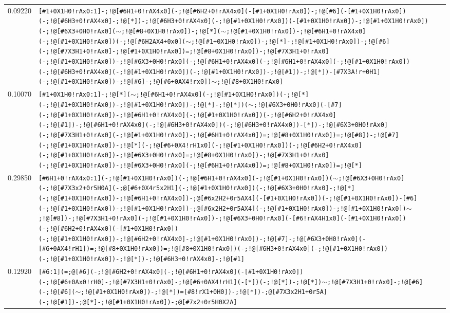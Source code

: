 \begin{longtable}{>{\baselineskip=10pt}p{} >{\baselineskip=10pt}p{}}
0.09220 & \texttt{[\#1+0X1H0!rAx0:1]-;!@[\#6H1+0!rAX4x0](-;!@[\#6H2+0!rAX4x0](-[\#1+0X1H0!rAx0])-;!@[\#6](-[\#1+0X1H0!rAx0])(-;!@[\#6H3+0!rAX4x0]-;!@[*])-;!@[\#6H3+0!rAX4x0](-;!@[\#1+0X1H0!rAx0])(-[\#1+0X1H0!rAx0])-;!@[\#1+0X1H0!rAx0])(-;!@[\#6X3+0H0!rAx0]($\sim$;!@[\#8+0X1H0!rAx0])-;!@[*]($\sim$;!@[\#1+0X1H0!rAx0])-;!@[\#6H1+0!rAX4x0](-;!@[\#1+0X1H0!rAx0])(-;!@[\#6H2AX4+0x0]($\sim$;!@[\#1+0X1H0!rAx0])-;!@[*]-;!@[\#1+0X1H0!rAx0])-;!@[\#6](-;!@[\#7X3H1+0!rAx0]-;!@[\#1+0X1H0!rAx0])=;!@[\#8+0X1H0!rAx0])-;!@[\#7X3H1+0!rAx0](-;!@[\#1+0X1H0!rAx0])-;!@[\#6X3+0H0!rAx0](-;!@[\#6H1+0!rAX4x0](-;!@[\#6H1+0!rAX4x0](-;!@[\#1+0X1H0!rAx0])(-;!@[\#6H3+0!rAX4x0](-;!@[\#1+0X1H0!rAx0])(-;!@[\#1+0X1H0!rAx0])-;!@[\#1])-;!@[*])-[\#7X3A!r+0H1](-;!@[\#1+0X1H0!rAx0])-;!@[\#6]-;!@[\#6+0AX4!rx0])$\sim$;!@[\#8+0X1H0!rAx0]} \\ 
0.10070 & \texttt{[\#1+0X1H0!rAx0:1]-;!@[*]($\sim$;!@[\#6H1+0!rAX4x0](-;!@[\#1+0X1H0!rAx0])(-;!@[*](-;!@[\#1+0X1H0!rAx0])-;!@[\#1+0X1H0!rAx0])-;!@[*]-;!@[*])($\sim$;!@[\#6X3+0H0!rAx0](-[\#7](-;!@[\#1+0X1H0!rAx0])-;!@[\#6H1+0!rAX4x0](-;!@[\#1+0X1H0!rAx0])(-;!@[\#6H2+0!rAX4x0](-;!@[\#1])-;!@[\#6H1+0!rAX4x0](-;!@[\#6H3+0!rAX4x0])(-;!@[\#6H3+0!rAX4x0])-[*])-;!@[\#6X3+0H0!rAx0](-;!@[\#7X3H1+0!rAx0](-;!@[\#1+0X1H0!rAx0])-;!@[\#6H1+0!rAX4x0])=;!@[\#8+0X1H0!rAx0])=;!@[\#8])-;!@[\#7](-;!@[\#1+0X1H0!rAx0])-;!@[*](-;!@[\#6+0X4!rH1x0](-;!@[\#1+0X1H0!rAx0])(-;!@[\#6H2+0!rAX4x0](-;!@[\#1+0X1H0!rAx0])-;!@[\#6X3+0H0!rAx0]=;!@[\#8+0X1H0!rAx0])-;!@[\#7X3H1+0!rAx0](-;!@[\#1+0X1H0!rAx0])-;!@[\#6X3+0H0!rAx0](-;!@[\#6H1+0!rAX4x0])=;!@[\#8+0X1H0!rAx0])=;!@[*]} \\ 
0.29850 & \texttt{[\#6H1+0!rAX4x0:1](-;!@[\#1+0X1H0!rAx0])(-;!@[\#6H1+0!rAX4x0](-;!@[\#1+0X1H0!rAx0])($\sim$;!@[\#6X3+0H0!rAx0](-;!@[\#7X3x2+0r5H0A](-;@[\#6+0X4r5x2H1](-;!@[\#1+0X1H0!rAx0])(-;!@[\#6X3+0H0!rAx0]-;!@[*](-;!@[\#1+0X1H0!rAx0])-;!@[\#6H1+0!rAX4x0])-;@[\#6x2H2+0r5AX4](-[\#1+0X1H0!rAx0])(-;!@[\#1+0X1H0!rAx0])-[\#6](-;!@[\#1+0X1H0!rAx0])-;!@[\#1+0X1H0!rAx0])-;@[\#6x2H2+0r5AX4](-;!@[\#1+0X1H0!rAx0])-;!@[\#1+0X1H0!rAx0])$\sim$;!@[\#8])-;!@[\#7X3H1+0!rAx0](-;!@[\#1+0X1H0!rAx0])-;!@[\#6X3+0H0!rAx0](-[\#6!rAX4H1x0](-[\#1+0X1H0!rAx0])(-;!@[\#6H2+0!rAX4x0](-[\#1+0X1H0!rAx0])(-;!@[\#1+0X1H0!rAx0])-;!@[\#6H2+0!rAX4x0]-;!@[\#1+0X1H0!rAx0])-;!@[\#7]-;!@[\#6X3+0H0!rAx0](-[\#6+0AX4!rH1])=;!@[\#8+0X1H0!rAx0])=;!@[\#8+0X1H0!rAx0])(-;!@[\#6H3+0!rAX4x0](-;!@[\#1+0X1H0!rAx0])(-;!@[\#1+0X1H0!rAx0])-;!@[*])-;!@[\#6H3+0!rAX4x0]-;!@[\#1]} \\ 
0.12920 & \texttt{[\#6:1](=;@[\#6](-;!@[\#6H2+0!rAX4x0](-;!@[\#6H1+0!rAX4x0](-[\#1+0X1H0!rAx0])(-;!@[\#6+0Ax0!rH0]-;!@[\#7X3H1+0!rAx0]-;!@[\#6+0AX4!rH1](-[*])(-;!@[*])-;!@[*])$\sim$;!@[\#7X3H1+0!rAx0]-;!@[\#6](-;!@[\#6]($\sim$;!@[\#1+0X1H0!rAx0])-;!@[*])=[\#8!rX1+0H0])-;!@[*])-;@[\#7X3x2H1+0r5A](-;!@[\#1])-;@[*]-;!@[\#1+0X1H0!rAx0])-;@[\#7x2+0r5H0X2A]} \\ 

\end{longtable}
